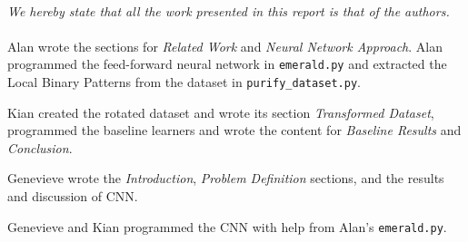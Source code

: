 \newpage
\begin{multicols}{2}
\paragraph*{} \lettrine[nindent=0em,lines=1]{\textit{W}}{}\textit{e hereby state that all the work presented in this report is that of the authors. }
\paragraph*{} Alan wrote the sections for \emph{Related Work} and \emph{Neural Network Approach}. Alan programmed the feed-forward neural network in \texttt{emerald.py} and extracted the Local Binary Patterns from the dataset in \texttt{purify\_dataset.py}. 
\par Kian created the rotated dataset and wrote its section \emph{Transformed Dataset}, programmed the baseline learners and wrote the content for \emph{Baseline Results} and \emph{Conclusion}. 
\par Genevieve wrote the \emph{Introduction}, \emph{Problem Definition} sections, and the results and discussion of CNN.
\par Genevieve and Kian programmed the CNN with help from Alan's \texttt{emerald.py}. 


\end{multicols}

